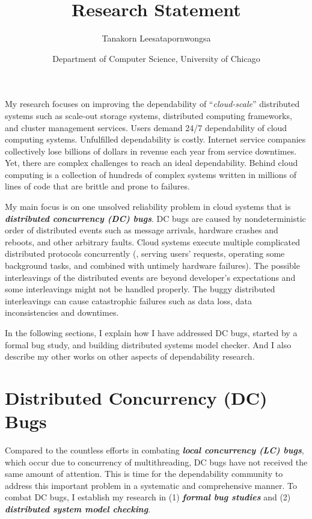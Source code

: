 \documentclass[11pt]{article}
\begin{document}
\title{Research Statement}
\author{Tanakorn Leesatapornwongsa}
\date{\vspace{-1ex} \small{Department of Computer Science, University of
Chicago}}

\maketitle

My research focuses on improving the dependability of ``\textit{cloud-scale}''
distributed systems such as scale-out storage systems, distributed computing
frameworks, and cluster management services. Users demand 24/7 dependability of
cloud computing systems. Unfulfilled dependability is costly. Internet service
companies collectively lose billions of dollars in revenue each year from
service downtimes. Yet, there are complex challenges to reach an ideal
dependability. Behind cloud computing is a collection of hundreds of complex
systems written in millions of lines of code that are brittle and prone to
failures.

My main focus is on one unsolved reliability problem in cloud systems that is
\textbf{\textit{distributed concurrency (DC) bugs}}. DC bugs are caused by
nondeterministic order of distributed events such as message arrivals, hardware
crashes and reboots, and other arbitrary faults. Cloud systems execute multiple
complicated distributed protocols concurrently (\eg, serving users' requests,
operating some background tasks, and combined with untimely hardware failures).
The possible interleavings of the distributed events are beyond developer's
expectations and some interleavings might not be handled properly.  The buggy
distributed interleavings can cause catastrophic failures such as data loss,
data inconsistencies and downtimes.

In the following sections, I explain how I have addressed DC bugs, started by a
formal bug study, and building distributed systems model checker. And I also
describe my other works on other aspects of dependability research.

\section{Distributed Concurrency (DC) Bugs}\label{dcbugs}

Compared to the countless efforts in combating \textbf{\textit{local concurrency
(LC) bugs}}, which occur due to concurrency of multithreading,
DC bugs have not received the same amount of attention. This is time for the
dependability community to address this important problem in a systematic and
comprehensive manner. To combat DC bugs, I establish my research in (1)
\textbf{\textit{formal bug studies}} and (2) \textbf{\textit{distributed system
model checking}}. 
\end{document}
